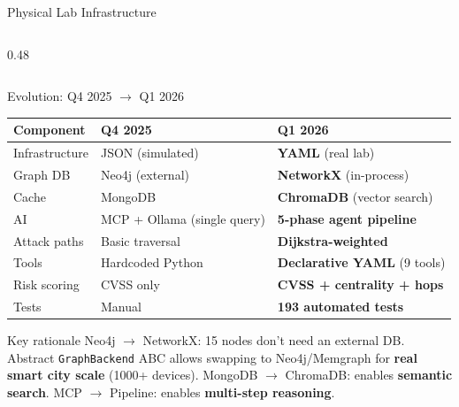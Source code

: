 \documentclass[aspectratio=169]{beamer}
\begin{document}
\begin{frame}{Physical Lab Infrastructure}
\begin{columns}[T]
\begin{column}{0.48\textwidth}
\end{column}
\end{columns}
\end{frame}

\begin{frame}{Evolution: Q4 2025 $\rightarrow$ Q1 2026}

\begin{table}
\centering
\small
\begin{tabular}{@{}lll@{}}
\toprule
\textbf{Component} & \textbf{Q4 2025} & \textbf{Q1 2026} \\
\midrule
Infrastructure & JSON (simulated) & \textbf{YAML} (real lab) \\
Graph DB & Neo4j (external) & \textbf{NetworkX} (in-process) \\
Cache & MongoDB & \textbf{ChromaDB} (vector search) \\
AI & MCP + Ollama (single query) & \textbf{5-phase agent pipeline} \\
Attack paths & Basic traversal & \textbf{Dijkstra-weighted} \\
Tools & Hardcoded Python & \textbf{Declarative YAML} (9 tools) \\
Risk scoring & CVSS only & \textbf{CVSS + centrality + hops} \\
Tests & Manual & \textbf{193 automated tests} \\
\bottomrule
\end{tabular}
\end{table}

\vspace{0.3cm}
\begin{block}{Key rationale}
Neo4j $\rightarrow$ NetworkX: 15 nodes don't need an external DB. Abstract \texttt{GraphBackend} ABC allows swapping to Neo4j/Memgraph for \textbf{real smart city scale} (1000+ devices). \quad MongoDB $\rightarrow$ ChromaDB: enables \textbf{semantic search}. \quad MCP $\rightarrow$ Pipeline: enables \textbf{multi-step reasoning}.
\end{block}
\end{frame}
\end{document}
